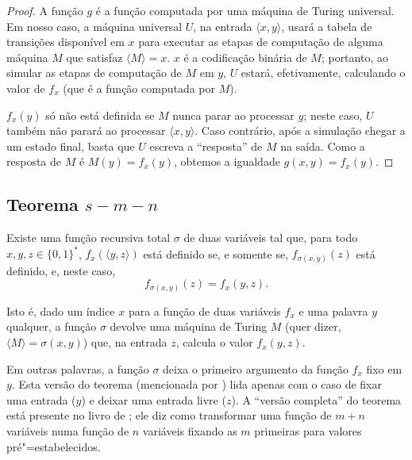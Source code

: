 \begin{proof}
    A função $g$ é a função computada por uma máquina de Turing universal.
    Em nosso caso,
    a máquina universal $U$,
    na entrada $\langle x, y \rangle$,
    usará a tabela de transições disponível em $x$
    para executar as etapas de computação de alguma máquina $M$
    que satisfaz $\langle M \rangle = x$.
    $x$ é a codificação binária de $M$;
    portanto,
    ao simular as etapas de computação de $M$ em $y$,
    $U$ estará, efetivamente,
    calculando o valor de $f_x$ (que é a função computada por $M$).

    $f_x(y)$ só não está definida se $M$ nunca parar ao processar $y$;
    neste caso, $U$ também não parará ao processar $\langle x, y \rangle$.
    Caso contrário,
    após a simulação chegar a um estado final,
    basta que $U$ escreva a ``resposta'' de $M$ na saída.
    Como a resposta de $M$ é $M(y) = f_x(y)$,
    obtemos a igualdade $g(x, y) = f_x(y)$.
\end{proof}

\subsection{Teorema $s-m-n$}
\label{sec:s_m_n_theorem}

\begin{theorem}
    Existe uma função recursiva total $\sigma$ de duas variáveis tal que,
    para todo $x, y, z \in \{0, 1\}^*$,
    $f_x( \langle y, z \rangle )$ está definido se, e somente se,
    $f_{\sigma(x, y)}(z)$ está definido, e,
    neste caso,
    \begin{equation*}
        f_{\sigma(x, y)}(z) = f_x(y, z).
    \end{equation*}
\end{theorem}

Isto é,
dado um índice $x$ para a função de duas variáveis $f_x$
e uma palavra $y$ qualquer,
a função $\sigma$ devolve uma máquina de Turing $M$
(quer dizer, $\langle M \rangle = \sigma(x, y)$)
que, na entrada $z$,
calcula o valor $f_x(y, z)$.

Em outras palavras,
a função $\sigma$ deixa o primeiro argumento da função $f_x$
fixo em $y$.
Esta versão do teorema
(mencionada por )
lida apenas com o caso de fixar uma entrada ($y$)
e deixar uma entrada livre ($z$).
A ``versão completa'' do teorema
está presente no livro de ;
ele diz como transformar uma função de $m + n$ variáveis
numa função de $n$ variáveis
fixando as $m$ primeiras para valores pré"=estabelecidos.

